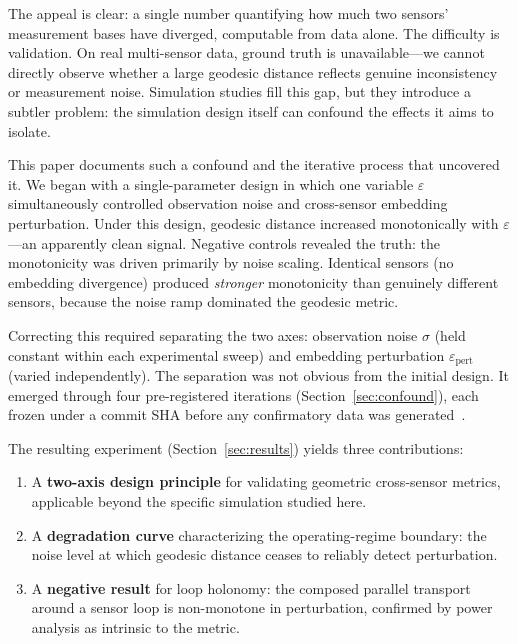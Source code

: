 \documentclass[11pt]{article}
\newcommand{\eps}{\varepsilon}
\newcommand{\epspert}{\eps_\mathrm{pert}}
\begin{document}
The appeal is clear: a single number quantifying how much two
sensors' measurement bases have diverged, computable from data
alone.  The difficulty is validation.  On real multi-sensor data,
ground truth is unavailable---we cannot directly observe whether a
large geodesic distance reflects genuine inconsistency or
measurement noise.  Simulation studies fill this gap, but they
introduce a subtler problem: the simulation design itself can
confound the effects it aims to isolate.

This paper documents such a confound and the iterative process that
uncovered it.  We began with a single-parameter design in which one
variable $\eps$ simultaneously controlled observation noise and
cross-sensor embedding perturbation.  Under this design, geodesic
distance increased monotonically with $\eps$---an apparently clean
signal.  Negative controls revealed the truth: the monotonicity was
driven primarily by noise scaling.  Identical
sensors (no embedding divergence) produced \emph{stronger}
monotonicity than genuinely different sensors, because the noise
ramp dominated the geodesic metric.

Correcting this required separating the two axes: observation noise
$\sigma$ (held constant within each experimental sweep) and
embedding perturbation $\epspert$ (varied independently).  The
separation was not obvious from the initial design.  It emerged
through four pre-registered iterations (Section~\ref{sec:confound}),
each frozen under a commit SHA before any confirmatory data was
generated~\citep{nosek2018preregistration}.

The resulting experiment (Section~\ref{sec:results}) yields three
contributions:

\begin{enumerate}
  \item A \textbf{two-axis design principle} for validating
    geometric cross-sensor metrics, applicable beyond the specific
    simulation studied here.
  \item A \textbf{degradation curve} characterizing the
    operating-regime boundary: the noise level at which geodesic
    distance ceases to reliably detect perturbation.
  \item A \textbf{negative result} for loop holonomy: the composed
    parallel transport around a sensor loop is non-monotone in
    perturbation, confirmed by power analysis as intrinsic to the
    metric.
\end{enumerate}
\end{document}
